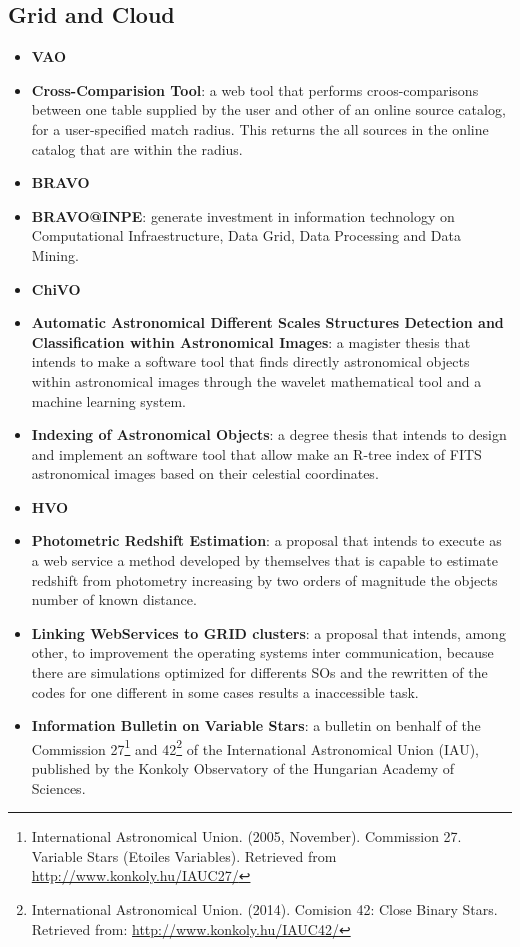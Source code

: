 \subsection{Grid and Cloud}
\begin{itemize}
\item \textbf{VAO}
\item \textbf{Cross-Comparision Tool}:
a web tool that performs croos-comparisons between one table supplied by the
user and other of an online source catalog, for a user-specified match radius.
This returns the all sources in the online catalog that are within the radius.

\item \textbf{BRAVO}
\item \textbf{BRAVO@INPE}:
generate investment in information technology on Computational Infraestructure,
Data Grid, Data Processing and Data Mining.

\item \textbf{ChiVO}
\item \textbf{Automatic Astronomical Different Scales Structures Detection and
Classification within Astronomical Images}:
a magister thesis that intends to make a software tool that finds directly
astronomical objects within astronomical images through the wavelet mathematical
tool and a machine learning system.

\item \textbf{Indexing of Astronomical Objects}:
a degree thesis that intends to design and implement an software tool that allow
make an R-tree index of FITS astronomical images based on their celestial
coordinates.

\item \textbf{HVO}
\item \textbf{Photometric Redshift Estimation}:
a proposal that intends to execute as a web service a method developed by
themselves that is capable to estimate redshift from photometry increasing by
two orders of magnitude the objects number of known distance. 

\item \textbf{Linking WebServices to GRID clusters}:
a proposal that intends, among other, to improvement the operating systems inter
communication, because there are simulations optimized for differents SOs and
the rewritten of the codes for one different in some cases results a
inaccessible task.

\item \textbf{Information Bulletin on Variable Stars}:
a bulletin on benhalf of the Commission 27\footnote{International Astronomical
Union. (2005, November). Commission 27. Variable Stars (Etoiles Variables).
Retrieved from \url{http://www.konkoly.hu/IAUC27/}} and
42\footnote{International Astronomical Union. (2014). Comision 42: Close Binary
Stars. Retrieved from: \url{http://www.konkoly.hu/IAUC42/}} of the International
Astronomical Union (IAU), published by the Konkoly Observatory of the Hungarian
Academy of Sciences. 


\end{itemize}

